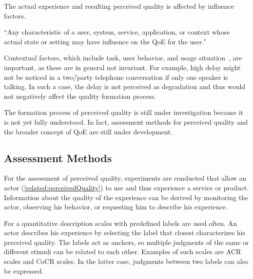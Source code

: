 The actual experience and resulting perceived quality is affected by influence factors.
\begin{definition}
``Any characteristic of a user, system, service, application, or context whose actual state or setting may have influence on the \acl{QoE} for the user.''~\citep[][p.\,56]{reiter_factors_2014}
\end{definition}
Contextual factors, which include task, user behavior, and usage situation~\citep[][p.\,56]{reiter_factors_2014}, are important, as these are in general not invariant.
For example, high delay might not be noticed in a two\=/party telephone conversation if only one speaker is talking.
In such a case, the delay is not perceived as degradation and thus would not negatively affect the quality formation process.

The formation process of perceived quality is still under investigation because it is not yet fully understood. %
In fact, assessment methods for perceived quality and the broader concept of \ac{QoE} are still under development.

\subsection{Assessment Methods}
For the assessment of perceived quality, experiments are conducted that allow an actor (\autoref{related:perceivedQuality}) to use and thus experience a service or product.
Information about the quality of the experience can be derived by monitoring the actor, observing his behavior, or requesting him to describe his experience.

For a quantitative description scales with predefined labels are used often.
An actor describes his experience by selecting the label that closest characterizes his perceived quality.
The labels act as anchors, so multiple judgments of the same or different stimuli can be related to each other.
Examples of such scales are \acf{ACR} scales and \acf{CoCR} scales.
In the latter case, judgments between two labels can also be expressed.

